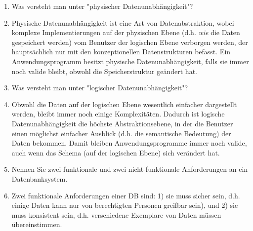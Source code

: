 \documentclass[12pt]{report}
\newcommand{\answer}{\textbf{A:}}
\begin{document}
\begin{enumerate}
\item[(5 P)] Was versteht man unter "physischer Datenunabhängigkeit"?
\item[\answer]
  Physische Datenunabhängigkeit ist eine Art von Datenabstraktion, wobei komplexe Implementierungen auf der physischen Ebene (d.h. \textit{wie} die Daten gespeichert werden) vom Benutzer der logischen Ebene verborgen werden, der hauptsächlich nur mit den konzeptionellen Datenstrukturen befasst. Ein Anwendungsprogramm besitzt physische Datenunabhängigkeit, falls sie immer noch valide bleibt, obwohl die Speicherstruktur geändert hat.


\item[(5 P)] Was versteht man unter "logischer Datenunabhängigkeit"?
\item[\answer]
  Obwohl die Daten auf der logischen Ebene wesentlich einfacher dargestellt werden, bleibt immer noch einige Komplexitäten. Dadurch ist logische Datenunabhängigkeit die höchste Abstraktionsebene, in der die Benutzer einen möglichst einfacher Ausblick (d.h. die semantische Bedeutung) der Daten bekommen. Damit bleiben Anwendungsprogramme immer noch valide, auch wenn das Schema (auf der logischen Ebene) sich verändert hat.


\item[(4 P)] Nennen Sie zwei funktionale und zwei nicht-funktionale Anforderungen an ein Datenbanksystem.
\item[\answer]
  Zwei funktionale Anforderungen einer DB sind: 1) sie muss sicher sein, d.h. einige Daten kann nur von berechtigten Personen greifbar sein), und 2) sie muss konsistent sein, d.h. verschiedene Exemplare von Daten müssen übereinstimmen.


\end{enumerate}
\end{document}
